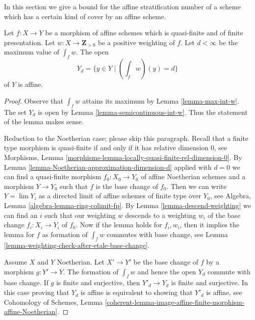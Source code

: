 \noindent
In this section we give a bound for the affine stratification number of a
scheme which has a certain kind of cover by an affine scheme.

\begin{lemma}
\label{lemma-affineness-of-large-open}
Let $f : X \to Y$ be a morphism of affine schemes which is
quasi-finite and of finite presentation.
Let $w : X \to \mathbf{Z}_{> 0}$ be a positive weighting of $f$.
Let $d < \infty$ be the maximum value of $\int_f w$. The open
$$
Y_d = \{y \in Y \mid (\textstyle{\int}_f w)(y) = d \}
$$
of $Y$ is affine.
\end{lemma}

\begin{proof}
Observe that $\int_f w$ attains its maximum by Lemma \ref{lemma-max-int-w}.
The set $Y_d$ is open by Lemma \ref{lemma-semicontinuous-int-w}.
Thus the statement of the lemma makes sense.

\medskip\noindent
Reduction to the Noetherian case; please skip this paragraph.
Recall that a finite type morphism is quasi-finite if and only
if it has relative dimension $0$, see
Morphisms, Lemma \ref{morphisms-lemma-locally-quasi-finite-rel-dimension-0}.
By Lemma \ref{lemma-Noetherian-approximation-dimension-d}
applied with $d = 0$ we can find a quasi-finite morphism $f_0 : X_0 \to Y_0$
of affine Noetherian schemes and a morphism $Y \to Y_0$ such that $f$
is the base change of $f_0$. Then we can write $Y = \lim Y_i$ as a directed
limit of affine schemes of finite type over $Y_0$, see
Algebra, Lemma \ref{algebra-lemma-ring-colimit-fp}.
By Lemma \ref{lemma-descend-weighting}
we can find an $i$ such that our weighting $w$
descends to a weighting $w_i$ of the base change $f_i : X_i \to Y_i$
of $f_0$. Now if the lemma holds for $f_i, w_i$, then it implies
the lemma for $f$ as formation of $\int_f w$ commutes with base
change, see Lemma \ref{lemma-weighting-check-after-etale-base-change}.

\medskip\noindent
Assume $X$ and $Y$ Noetherian. Let $X' \to Y'$ be the base change of $f$
by a morphism $g : Y' \to Y$. The formation of $\int_f w$ and hence
the open $Y_d$ commute with base change. If $g$ is finite and surjective, then
$Y'_d \to Y_d$ is finite and surjective. In this case proving that
$Y_d$ is affine is equivalent to showing that $Y'_d$ is affine, see
Cohomology of Schemes, Lemma
\ref{coherent-lemma-image-affine-finite-morphism-affine-Noetherian}.


\end{proof}

